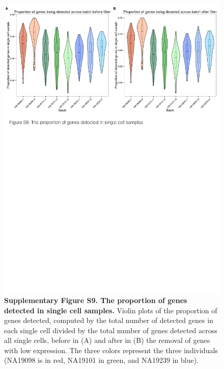 \begin{figure}[htbp]
\centering
\includegraphics[width=5in]{img/ch04/Figure14.jpeg}
\caption{\textbf{Supplementary Figure S9. The proportion of genes
detected in single cell samples.} Violin plots of the proportion of
genes detected, computed by the total number of detected genes in each
single cell divided by the total number of genes detected across all
single cells, before in (A) and after in (B) the removal of genes with
low expression. The three colors represent the three individuals
(NA19098 is in red, NA19101 in green, and NA19239 in blue).}
\end{figure}

